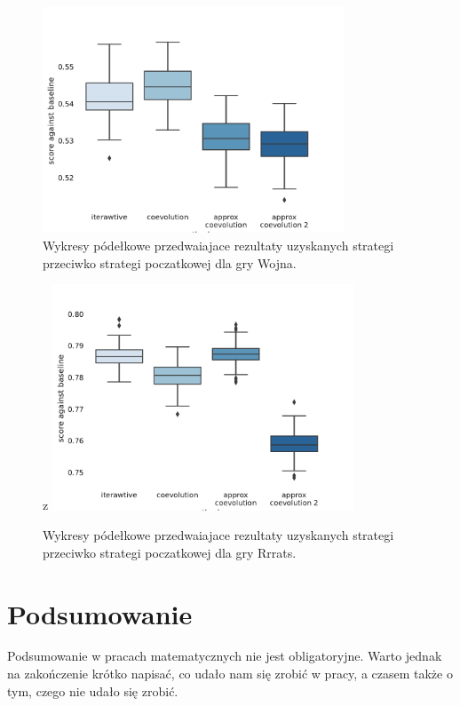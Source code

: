 \documentclass[inzynierska]{pwr_wmat_praca_dyplomowa}
\theoremstyle{plain}
\numberwithin{theorem}{chapter}
\theoremstyle{definition}
\numberwithin{theorem}{chapter}
\begin{document}
	\begin{figure}
		\centering
		\includegraphics[width=0.8\textwidth]{imagens/war_results.pdf}
		\caption{Wykresy pódełkowe przedwaiajace rezultaty uzyskanych strategi przeciwko strategi poczatkowej dla gry Wojna.}
		\label{fig:war_results}
	\end{figure}
	\begin{figure}z
		\centering
		\includegraphics[width=0.8\textwidth]{imagens/rrrats_results.pdf}
		\caption{Wykresy pódełkowe przedwaiajace rezultaty uzyskanych strategi przeciwko strategi poczatkowej dla gry Rrrats.}
		\label{fig:rrrats_results}
	\end{figure}
	
	


	\newpage

	
	

	
	
{\backmatter \chapter{Podsumowanie}}
Podsumowanie w pracach matematycznych nie jest obligatoryjne. Warto jednak na zakończenie krótko napisać, co udało nam się zrobić w pracy, a czasem także o tym, czego nie udało się zrobić.
\end{document}
